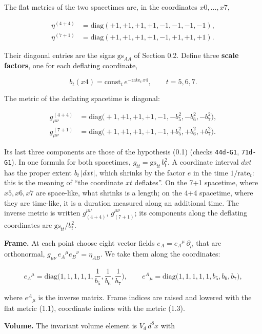 \documentclass[
  10pt,
]{article}
\begin{document}
The flat metrics of the two spacetimes are, in the coordinates
\(x0,\dots,x7\),

\[\begin{aligned}
\eta^{(4+4)}&=\mathrm{diag}(+1,+1,+1,+1,-1,-1,-1,-1),\\
\eta^{(7+1)}&=\mathrm{diag}(+1,+1,+1,+1,-1,+1,+1,+1).
\end{aligned}\tag{1.1}\]

Their diagonal entries are the signs \(\mathrm{gs}_{AA}\) of Section
0.2. Define three \textbf{scale factors}, one for each deflating
coordinate,

\[b_t(x4)=\mathrm{const}_t\,e^{-\mathrm{rate}_t\,x4},\qquad t=5,6,7.\tag{1.2}\]

The metric of the deflating spacetime is diagonal:

\[\begin{aligned}
g^{(4+4)}_{\mu\nu}&=\mathrm{diag}\big(+1,+1,+1,+1,-1,-b_5^2,-b_6^2,-b_7^2\big),\\
g^{(7+1)}_{\mu\nu}&=\mathrm{diag}\big(+1,+1,+1,+1,-1,+b_5^2,+b_6^2,+b_7^2\big).
\end{aligned}\tag{1.3}\]

Its last three components are those of the hypothesis (0.1) (checks
\texttt{44d-G1}, \texttt{71d-G1}). In one formula for both spacetimes,
\(g_{tt}=\mathrm{gs}_{tt}\,b_t^2\). A coordinate interval \(dxt\) has
the proper extent \(b_t\,|dxt|\), which shrinks by the factor \(e\) in
the time \(1/\mathrm{rate}_t\): this is the meaning of ``the coordinate
\(xt\) deflates''. On the 7+1 spacetime, where \(x5,x6,x7\) are
space-like, what shrinks is a length; on the 4+4 spacetime, where they
are time-like, it is a duration measured along an additional time. The
inverse metric is written \(g_{(4+4)}^{\mu\nu}\),
\(g_{(7+1)}^{\mu\nu}\); its components along the deflating coordinates
are \(\mathrm{gs}_{tt}/b_t^2\).

\textbf{Frame.} At each point choose eight vector fields
\(e_A=e_A{}^\mu\,\partial_\mu\) that are orthonormal,
\(g_{\mu\nu}\,e_A{}^\mu e_B{}^\nu=\eta_{AB}\). We take them along the
coordinates:

\[e_A{}^\mu=\mathrm{diag}\Big(1,1,1,1,1,\frac1{b_5},\frac1{b_6},\frac1{b_7}\Big),\qquad
e^A{}_\mu=\mathrm{diag}\big(1,1,1,1,1,b_5,b_6,b_7\big),\tag{1.4}\]

where \(e^A{}_\mu\) is the inverse matrix. Frame indices are raised and
lowered with the flat metric (1.1), coordinate indices with the metric
(1.3).

\textbf{Volume.} The invariant volume element is \(V_d\,d^8x\) with
\end{document}
